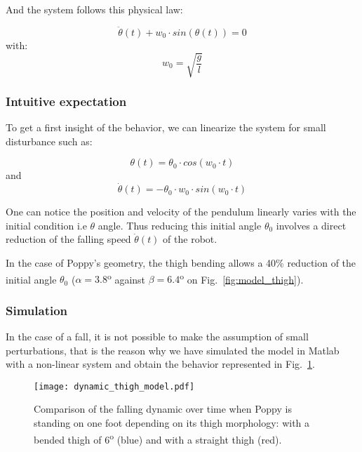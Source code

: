 And the system follows this physical law:

\begin{equation}
    \ddot{\theta}(t) + w_0 \cdot sin(\theta(t)) = 0
\end{equation}
with:
\begin{equation}
    w_0 = \sqrt{\frac{g}{l}}
\end{equation}

\subsubsection{Intuitive expectation} %

To get a first insight of the behavior, we can linearize the system for small disturbance such as:

\begin{equation}
    \theta(t) = \theta_0 \cdot cos(w_0\cdot t)
\end{equation}
and
\begin{equation}
    \dot{\theta}(t) = -\theta_0 \cdot w_0 \cdot sin(w_0\cdot t)
\end{equation}

One can notice the position and velocity of the pendulum linearly varies with the initial condition i.e $\theta$ angle. Thus reducing this initial angle $\theta_0$ involves a direct reduction of the falling speed $\dot{\theta}(t)$ of the robot.

In the case of Poppy's geometry, the thigh bending allows a 40\% reduction of the initial angle $\theta_0$ ($\alpha = 3.8$\textsuperscript{o} against $ \beta = 6.4$\textsuperscript{o} on Fig.~\ref{fig:model_thigh}).

\subsubsection{Simulation} %

In the case of a fall, it is not possible to make the assumption of small perturbations, that is the reason why we have simulated the model in Matlab with a non-linear system and obtain the behavior represented in Fig.~\ref{fig:dynamic_thigh_model}.

\begin{figure}[thpb]
    \centering
    \texttt{[image: dynamic\_thigh\_model.pdf]}
    \caption{Comparison of the falling dynamic over time when Poppy is standing on one foot depending on  its thigh morphology: with a bended thigh of 6\textsuperscript{o} (blue) and with a straight thigh (red).}
    \label{fig:dynamic_thigh_model}
\end{figure}

